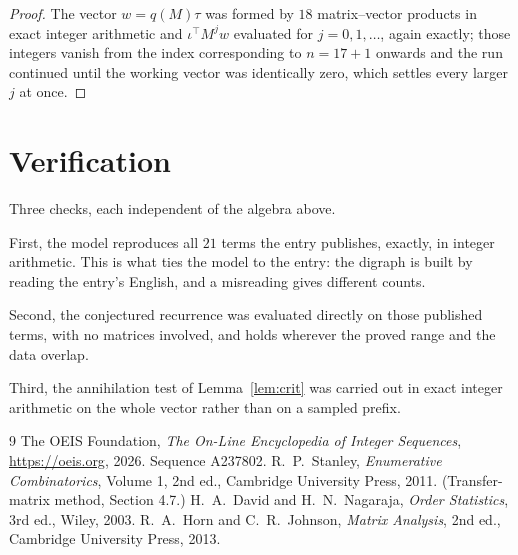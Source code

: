 \documentclass[11pt,a4paper]{article}
\theoremstyle{plain}
\theoremstyle{definition}
\begin{document}
\begin{proof}
The vector $w=q(M)\tau$ was formed by $18$ matrix--vector products in exact integer
arithmetic and $\iota^{\!\top}M^{j}w$ evaluated for $j=0,1,\dots$, again exactly; those
integers vanish from the index corresponding to $n=17+1$ onwards and the run continued
until the working vector was identically zero, which settles every larger $j$ at once.
\end{proof}

\section{Verification}

Three checks, each independent of the algebra above.

First, the model reproduces all $21$ terms the entry publishes, exactly, in integer
arithmetic. This is what ties the model to the entry: the digraph is built by reading the
entry's English, and a misreading gives different counts.

Second, the conjectured recurrence was evaluated directly on those published terms, with no
matrices involved, and holds wherever the proved range and the data overlap.

Third, the annihilation test of Lemma~\ref{lem:crit} was carried out in exact integer
arithmetic on the whole vector rather than on a sampled prefix.

\begin{thebibliography}{9}
 The OEIS Foundation, \emph{The On-Line Encyclopedia of Integer
Sequences}, \url{https://oeis.org}, 2026. Sequence A237802.
 R.~P.~Stanley, \emph{Enumerative Combinatorics}, Volume 1, 2nd ed.,
Cambridge University Press, 2011. (Transfer-matrix method, Section 4.7.)
 H.~A.~David and H.~N.~Nagaraja, \emph{Order Statistics}, 3rd ed., Wiley,
2003.
 R.~A.~Horn and C.~R.~Johnson, \emph{Matrix Analysis}, 2nd ed., Cambridge
University Press, 2013.
\end{thebibliography}
\end{document}
